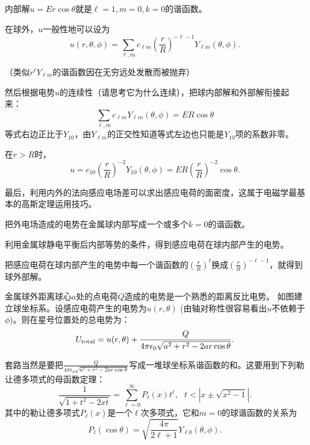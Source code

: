 \documentclass[CJK]{beamer}
\begin{document}
\begin{frame}
\bch
  内部解$u=Er\cos\theta$就是$\ell = 1, m=0, k=0$的谐函数。

  \skipline
  
  在球外，$u$一般性地可以设为
  $$u(r, \theta,\phi)= \sum_{\ell,m} c_{\ell m}\left(\frac{r}{R}\right)^{-\ell-1} Y_{\ell m}(\theta,\phi).$$

{\darkgreen \small （类似$r^\ell Y_{\ell m}$的谐函数因在无穷远处发散而被抛弃）}


然后根据电势$u$的连续性（请思考它为什么连续），把球内部解和外部解衔接起来：
$$ \sum_{\ell,m} c_{\ell m} Y_{\ell m}(\theta,\phi)  = ER\cos\theta $$
等式右边正比于$Y_{10}$，由$Y_{\ell m}$的正交性知道等式左边也只能是$Y_{10}$项的系数非零。
\ech
\end{frame}


\begin{frame}
\bch
在$r>R$时，
$$ u = c_{10}\left(\frac{r}{R}\right)^{-2}Y_{10}(\theta,\phi) = ER \left(\frac{r}{R}\right)^{-2}\cos\theta. $$

最后，利用内外的法向感应电场差可以求出感应电荷的面密度，这属于电磁学最基本的高斯定理运用技巧。

\ech
\end{frame}





\begin{frame}
\bch
{}
\bitem
\item{把外电场造成的电势在金属球内部写成一个或多个$k=0$的谐函数。}
\item{利用金属球静电平衡后内部等势的条件，得到感应电荷在球内部产生的电势。}
\item{把感应电荷在球内部产生的电势中每一个谐函数的$\left(\frac{r}{R}\right)^\ell$换成$\left(\frac{r}{R}\right)^{-\ell-1}$，就得到球外部解。}  
\eitem
\ech
\end{frame}

\begin{frame}
\bch
金属球外距离球心$a$处的点电荷$Q$造成的电势是一个熟悉的距离反比电势。
\emini
{}
如图建立球坐标系。设感应电荷产生的电势为$u(r, \theta)$ (由轴对称性很容易看出$u$不依赖于$\phi$)。则在星号位置处的总电势为：
\emini
$$U_{\rm total} = u(r, \theta) +\frac{Q}{4\pi\epsilon_0 \sqrt{a^2+r^2-2ar\cos\theta}}. $$
\ech
\end{frame}

\begin{frame}
\bch
套路当然是要把$\frac{Q}{4\pi\epsilon_0 \sqrt{a^2+r^2-2ar\cos\theta}}$写成一堆球坐标系谐函数的和。这要用到下列{\blue 勒让德多项式的母函数定理：
  $$ \frac{1}{\sqrt{1+t^2-2xt}} = \sum_{\ell =0}^\infty P_\ell (x) t^\ell,\ \ \ t<|x\pm \sqrt{x^2-1}|  .$$}
其中的勒让德多项式$P_\ell(x)$是一个$\ell$次多项式，它和$m=0$的球谐函数的关系为{\blue 
$$P_\ell(\cos\theta) = \sqrt{\frac{4\pi}{2\ell + 1}}Y_{\ell 0}(\theta,\phi).$$}
\ech
\end{frame}
\end{document}
